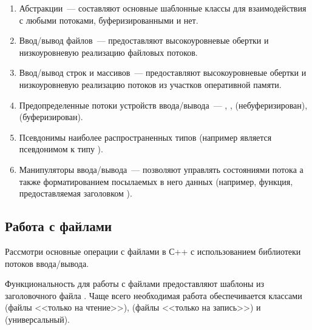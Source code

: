 \begin{enumerate}
    \item Абстракции~--- составляют основные шаблонные классы для взаимодействия с любыми потоками, буферизированными и нет.
    \item Ввод/вывод файлов~--- предоставляют высокоуровневые обертки и низкоуровневую реализацию файловых потоков.
    \item Ввод/вывод строк и массивов~--- предоставляют высокоуровневые обертки и низкоуровневую реализацию потоков из участков оперативной памяти.
    \item Предопределенные потоки устройств ввода/вывода~--- , ,  (небуферизирован),  (буферизирован)\footnotemark.
    \item Псевдонимы наиболее распространенных типов (например  является псевдонимом к типу ).
    \item Манипуляторы ввода/вывода~--- позволяют управлять состояниями потока а также форматированием посылаемых в него
          данных (например, функция, предоставляемая заголовком ).
\end{enumerate}


\subsection{Работа с файлами}
Рассмотри основные операции с файлами в С++ с использованием библиотеки потоков ввода/вывода.

Функциональность для работы с файлами предоставляют шаблоны из заголовочного файла . Чаще всего необходимая работа обеспечивается
классами  (файлы <<только на чтение>>),  (файлы <<только на запись>>) и  (универсальный).

